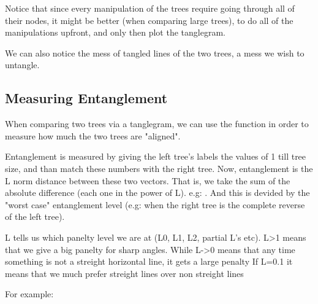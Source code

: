 \documentclass[shortnames,nojss,article]{jss}\usepackage[]{graphicx}\usepackage[]{color}
\begin{document}
Notice that since every manipulation of the trees require going through all of their nodes, it might be better (when comparing large trees), to do all of the manipulations upfront, and only then plot the tanglegram.

We can also notice the mess of tangled lines of the two trees, a mess we wish to untangle.

\subsection{Measuring Entanglement}

When comparing two trees via a tanglegram, we can use the  function in order to measure how much the two trees are "aligned".

Entanglement is measured by giving the left tree's labels the values of 1 till tree size, and than match these numbers with the right tree. Now, entanglement is the L norm distance between these two vectors.
That is, we take the sum of the absolute difference (each one in the power of L). e.g: .
And this is devided by the "worst case" entanglement level (e.g: when the right tree is the complete reverse of the left tree).

L tells us which panelty level we are at (L0, L1, L2, partial L's etc).  L>1 means that we give a big panelty for sharp angles.  While L->0 means that any time something is not a streight horizontal line, it gets a large penalty If L=0.1 it means that we much prefer streight lines over non streight lines


For example:
\end{document}
